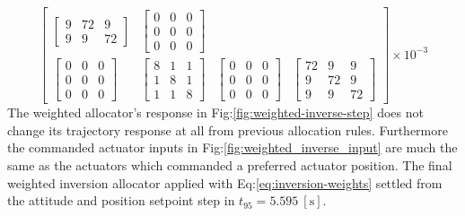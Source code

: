 \begin{equation}
\begin{bmatrix}
\begin{bmatrix}
9 & 72 & 9\\
9 & 9 & 72
\end{bmatrix}
&
\begin{bmatrix}
0 & 0 & 0\\
0 & 0 & 0\\
0 & 0 & 0
\end{bmatrix}
\\
\begin{bmatrix}
0 & 0 & 0\\
0 & 0 & 0\\
0 & 0 & 0
\end{bmatrix}
&
\begin{bmatrix}
8 & 1 & 1\\
1 & 8 & 1\\
1 & 1 & 8
\end{bmatrix}
&
\begin{bmatrix}
0 & 0 & 0\\
0 & 0 & 0\\
0 & 0 & 0
\end{bmatrix}
&
\begin{bmatrix}
72 & 9 & 9\\
9 & 72 & 9\\
9 & 9 & 72
\end{bmatrix}
\end{bmatrix}\times 10^{-3}
\end{equation}
\newpage
The weighted allocator's response in Fig:\ref{fig:weighted-inverse-step} does not change its trajectory response at all from previous allocation rules. Furthermore the commanded actuator inputs in Fig:\ref{fig:weighted_inverse_input} are much the same as the actuators which commanded a preferred actuator position. The final weighted inversion allocator applied with Eq:\ref{eq:inversion-weights} settled from the attitude and position setpoint step in $t_{95}=5.595~[\text{s}]$.

